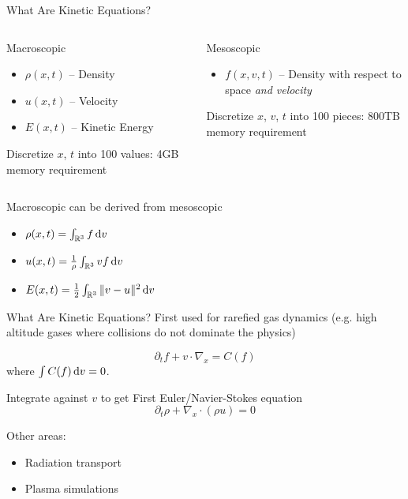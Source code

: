 \documentclass{beamer}
\renewcommand{\vec}[1]{\ensuremath{#1}}
\newcommand{\R}{\ensuremath{\mathbb{R}}\xspace}
\begin{document}
    \begin{frame}{What Are Kinetic Equations?}
        \begin{columns}[t]
            \begin{block}{Macroscopic}
                \begin{itemize}
                    \item $\rho(\vec{x},t)$ -- Density
                    \item $\vec{u}(\vec{x},t)$ -- Velocity
                    \item $E(\vec{x},t)$ -- Kinetic Energy
                \end{itemize}
                Discretize \vec{x}, $t$ into 100 values: 4GB memory requirement
            \end{block}
            \begin{block}{Mesoscopic}
                \begin{itemize}
                    \item $f(\vec{x},\vec{v},t)$ -- Density with respect to space \emph{and velocity}
                \end{itemize}
                Discretize \vec{x}, \vec{v}, $t$ into 100 pieces: 800TB memory requirement
            \end{block}
        \end{columns}

        \vfill

        Macroscopic can be derived from mesoscopic
        \begin{itemize}
            \item $\rho(\vec{x},t) = \int_{\R^3} f \dif \vec{v}$
            \item $\vec{u}(\vec{x},t) = \frac{1}{\rho} \int_{\R^3} \vec{v}f \dif \vec{v}$
            \item $E(\vec{x},t) = \frac{1}{2} \int_{\R^3} \| \vec{v} - \vec{u} \|^2 \dif \vec{v}$
        \end{itemize}
    \end{frame}

    \begin{frame}{What Are Kinetic Equations?}
        First used for rarefied gas dynamics (e.g. high altitude gases where collisions do not dominate the physics)

        \[\partial_t f + \vec{v} \cdot \nabla_\vec{x} = C(f)\]
        where $\int C(f) \dif \vec{v} = 0$.

        \vfill

        Integrate against \vec{v} to get First Euler/Navier-Stokes equation
        \[\partial_t \rho + \nabla_{\vec{x}} \cdot (\rho \vec{u}) = 0\]

        \vfill

        Other areas:
        \begin{itemize}
            \item Radiation transport
            \item Plasma simulations
        \end{itemize}
    \end{frame}
\end{document}

